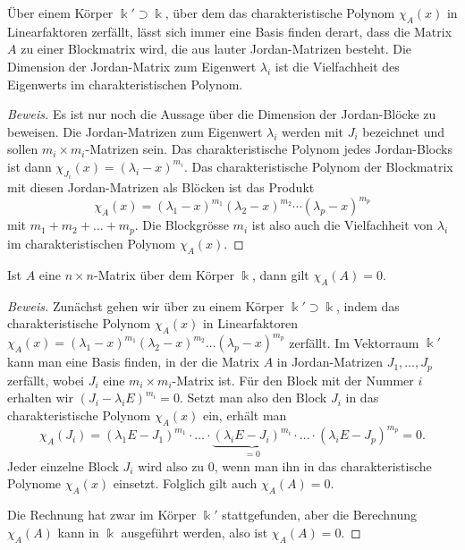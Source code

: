 \begin{satz}
\label{buch:eigenwerte:satz:jordannormalform}
Über einem Körper $\Bbbk'\supset\Bbbk$, über dem das charakteristische
Polynom $\chi_A(x)$ in Linearfaktoren zerfällt, lässt sich immer
eine Basis finden derart, dass die Matrix $A$ zu einer Blockmatrix wird,
die aus lauter Jordan-Matrizen besteht.
Die Dimension der Jordan-Matrix zum Eigenwert $\lambda_i$ ist die
Vielfachheit des Eigenwerts im charakteristischen Polynom.
\end{satz}

\begin{proof}[Beweis]
Es ist nur noch die Aussage über die Dimension der Jordan-Blöcke zu
beweisen.
Die Jordan-Matrizen zum Eigenwert $\lambda_i$ werden mit $J_i$
bezeichnet und sollen $m_i\times m_i$-Matrizen sein.
Das charakteristische Polynom jedes Jordan-Blocks ist dann
$\chi_{J_i}(x)=(\lambda_i-x)^{m_i}$.
Das charakteristische Polynom der Blockmatrix mit diesen Jordan-Matrizen
als Blöcken ist das Produkt
\[
\chi_A(x)
=
(\lambda_1-x)^{m_1}
(\lambda_2-x)^{m_2}
\cdots
(\lambda_p-x)^{m_p}
\]
mit $m_1+m_2+\dots+m_p$.
Die Blockgrösse $m_i$ ist also auch die Vielfachheit von $\lambda_i$ im
charakteristischen Polynom $\chi_A(x)$.
\end{proof}



\begin{satz}
Ist $A$ eine $n\times n$-Matrix über dem Körper $\Bbbk$, dann gilt
$\chi_A(A)=0$.
\end{satz}

\begin{proof}[Beweis]
Zunächst gehen wir über zu einem Körper $\Bbbk'\supset\Bbbk$, indem
das charakteristische Polynom $\chi_A(x)$ in Linearfaktoren
$\chi_A(x)
=
(\lambda_1-x)^{m_1}
(\lambda_2-x)^{m_2}
\dots
(\lambda_p-x)^{m_p}$
zerfällt.
Im Vektorraum $\Bbbk'$ kann man eine Basis finden, in der die Matrix
$A$ in Jordan-Matrizen $J_1,\dots,J_p$ zerfällt, wobei $J_i$ eine
$m_i\times m_i$-Matrix ist.
Für den Block mit der Nummer $i$ erhalten wir
$(J_i - \lambda_i E)^{m_i} = 0$.
Setzt man also den Block $J_i$ in das charakteristische Polynom
$\chi_A(x)$ ein, erhält man
\[
\chi_A(J_i)
=
(\lambda_1E - J_1)^{m_1}
\cdot
\ldots
\cdot
\underbrace{
(\lambda_iE - J_i)^{m_i}
}_{\displaystyle=0}
\cdot
\ldots
\cdot
(\lambda_iE - J_p)^{m_p}
=
0.
\]
Jeder einzelne Block $J_i$ wird also zu $0$, wenn man ihn in das
charakteristische Polynome $\chi_A(x)$ einsetzt.
Folglich gilt auch $\chi_A(A)=0$.

Die Rechnung hat zwar im Körper $\Bbbk'$ stattgefunden, aber die Berechnung
$\chi_A(A)$ kann in $\Bbbk$ ausgeführt werden, also ist $\chi_A(A)=0$.
\end{proof}

